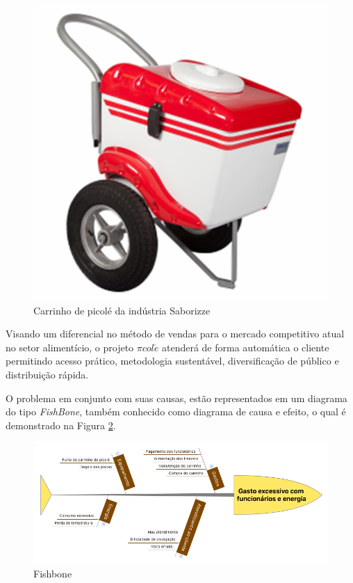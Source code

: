 \begin{figure}[htb]
	\centering
    \includegraphics[scale=0.3]{figuras/carrinho}
    \caption{Carrinho de picolé da indústria Saborizze}
    \label{fig:carrinho}
\end{figure}


Visando um diferencial no método de vendas para o mercado competitivo atual no setor alimentício, o projeto $\pi col\acute{e}$ atenderá de forma automática o cliente permitindo acesso prático, metodologia sustentável, diversificação de público e distribuição rápida.

O problema em conjunto com suas causas, estão representados em um diagrama do tipo \textit{FishBone}, também conhecido como diagrama de causa e efeito, o qual é demonstrado na Figura \ref{fig:fishbone}.

\begin{figure}[htb]
	\centering
    \includegraphics[width=\textwidth]{figuras/fishbone}
    \caption{Fishbone}
    \label{fig:fishbone}
\end{figure}



